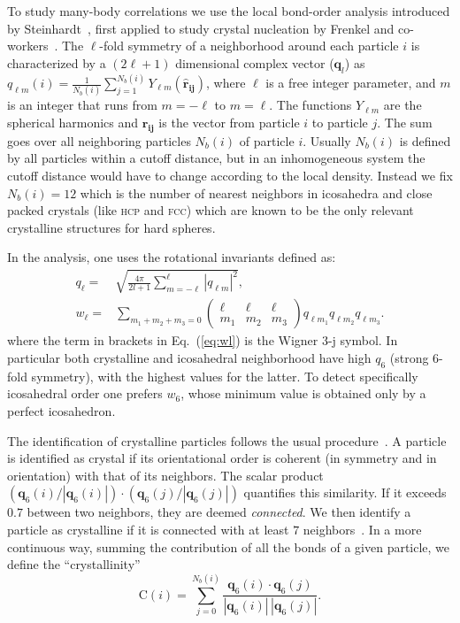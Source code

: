 \documentclass[twocolumn,superscriptaddress]{revtex4}
\begin{document}
To study many-body correlations we use the local bond-order analysis introduced by
Steinhardt~\cite{steinhardt}, first applied to study crystal nucleation by
Frenkel and co-workers~\cite{auer}. 
The $\ell$-fold symmetry of a neighborhood around each particle $i$ is characterized by a $(2\ell+1)$ dimensional complex vector ($\mathbf{q}_l$) as $q_{\ell m}(i)=\frac{1}{N_b(i)}\sum_{j=1}^{N_b(i)} Y_{\ell m}(\mathbf{\hat{r}_{ij}})$, where
$\ell$ is a free integer parameter, and $m$ is an integer
that runs from $m=-\ell$ to $m=\ell$. The functions $Y_{\ell m}$ are the spherical harmonics
and $\mathbf{\hat{r}_{ij}}$ is the vector from particle $i$ to particle $j$.
The sum goes over all neighboring particles $N_b(i)$ of particle $i$. Usually 
$N_b(i)$ is defined by all particles within a cutoff distance, but in an inhomogeneous system
the cutoff distance would have to change according to the local density. Instead we 
fix $N_b(i)=12$ which is the number of nearest neighbors in icosahedra and close packed crystals (like \textsc{hcp} and \textsc{fcc})
which are known to be the only relevant crystalline structures for hard spheres.

In the analysis, one uses the rotational invariants defined as:
\begin{align}
	q_\ell =& \sqrt{\frac{4\pi}{2l+1} \sum_{m=-\ell}^{\ell} |q_{\ell m}|^2 }, \label{eq:ql}\\
	w_\ell =& \sum_{m_1+m_2+m_3=0} 
			\left( \begin{array}{ccc}
				\ell & \ell & \ell \\
				m_1 & m_2 & m_3 
			\end{array} \right)
			q_{\ell m_1} q_{\ell m_2} q_{\ell m_3}. \label{eq:wl}
\end{align}
where the term in brackets in Eq.~(\ref{eq:wl}) is the Wigner 3-j symbol.
In particular both crystalline and icosahedral neighborhood have high $q_6$ (strong 6-fold symmetry), with the highest values for the latter. To detect specifically icosahedral order one prefers $w_6$, whose minimum value is obtained only by a perfect icosahedron.

The identification of crystalline particles follows the usual procedure~\cite{auer}. A particle is identified as crystal if
its orientational order is coherent (in symmetry and in orientation) with that of its neighbors.
The scalar product $(\mathbf{q}_6(i)/|\mathbf{q}_6(i)|)\cdot(\mathbf{q}_6(j)/|\mathbf{q}_6(j)|)$ quantifies this similarity. If it exceeds $0.7$ between
two neighbors, they are deemed \emph{connected}. We then identify a particle as crystalline if it is connected with at least $7$ neighbors~\cite{auer}. In a more continuous way, summing the contribution of all the bonds of a given particle, we define the ``crystallinity''~\cite{russo_hs}
\begin{equation}\label{eqn:crystallinity}
 \text{C}(i)=\sum_{j=0}^{N_b(i)}\frac{\mathbf{q}_6(i)\cdot\mathbf{q}_6(j)}{|\mathbf{q}_6(i)|\,|\mathbf{q}_6(j)|}.
\end{equation}
\end{document}
